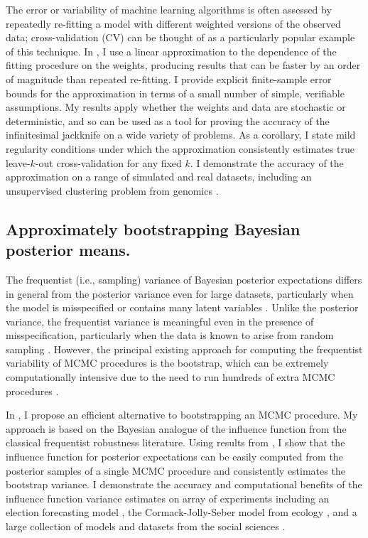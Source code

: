 The error or variability of machine learning algorithms is often assessed by
repeatedly re-fitting a model with different weighted versions of the observed
data; cross-validation (CV) can be thought of as a particularly popular example
of this technique.
%
In \citet{giordano:2019:ij}, I use a linear approximation to the dependence of
the fitting procedure on the weights, producing results that can be faster by an
order of magnitude than repeated re-fitting. I provide explicit finite-sample
error bounds for the approximation in terms of a small number of simple,
verifiable assumptions.  My results apply whether the weights and data are
stochastic or deterministic, and so can be used as a tool for proving the
accuracy of the infinitesimal jackknife on a wide variety of problems. As a
corollary, I state mild regularity conditions under which the approximation
consistently estimates true leave-$k$-out cross-validation for any fixed $k$. I
demonstrate the accuracy of the approximation on a range of simulated and real
datasets, including an unsupervised clustering problem from genomics
\citep{Luan:2003:clustering, shoemaker:2015:ultrasensitive}.


\subsection*{Approximately bootstrapping Bayesian posterior means.}

The frequentist (i.e., sampling) variance of Bayesian posterior expectations
differs in general from the posterior variance even for large datasets,
particularly when the model is misspecified or contains many latent variables
\citep{kleijn:2006:misspecification}. Unlike the posterior variance, the
frequentist variance is meaningful even in the presence of misspecification,
particularly when the data is known to arise from random sampling
\citep{waddell:2002:bayesphyloboot}.  However, the principal existing approach
for computing the frequentist variability of MCMC procedures is the bootstrap,
which can be extremely computationally intensive due to the need to run hundreds
of extra MCMC procedures \citep{huggins:2019:bayesbag}.

In \citet{giordano:2021:bayesij, giordano:2020:stanconbayesij}, I propose an
efficient alternative to bootstrapping an MCMC procedure.  My approach is based
on the Bayesian analogue of the influence function from the classical
frequentist robustness literature.  Using results from
\citep{giordano:2018:covariances, giordano:2019:ij}, I show that the influence
function for posterior expectations can be easily computed from the posterior
samples of a single MCMC procedure and consistently estimates the bootstrap
variance. I demonstrate the accuracy and computational benefits of the influence
function variance estimates on array of experiments including an election
forecasting model \citep{economist:2020:election}, the Cormack-Jolly-Seber model
from ecology \citep{kery:2011:bayesian}, and a large collection of models and
datasets from the social sciences \citep{gelman:2006:arm}.

